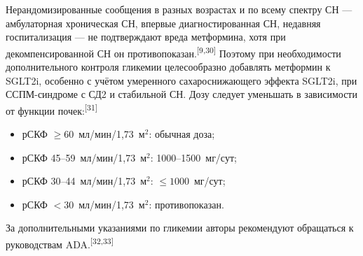 \documentclass[11pt,a4paper]{article}
\newcommand{\src}[1]{\textsuperscript{[#1]}}
\newcommand{\unitgfr}{мл/мин/1,73~м$^2$}
\begin{document}
Нерандомизированные сообщения в разных возрастах и по всему спектру СН --- амбулаторная хроническая СН, впервые диагностированная СН, недавняя госпитализация --- не подтверждают вреда метформина, хотя при декомпенсированной СН он противопоказан.\src{9,30} Поэтому при необходимости дополнительного контроля гликемии целесообразно добавлять метформин к SGLT2i, особенно с учётом умеренного сахароснижающего эффекта SGLT2i, при ССПМ-синдроме с СД2 и стабильной СН. Дозу следует уменьшать в зависимости от функции почек:\src{31}
\begin{itemize}
\item рСКФ $\geq60$~\unitgfr: обычная доза;
\item рСКФ 45--59~\unitgfr: 1000--1500~мг/сут;
\item рСКФ 30--44~\unitgfr: $\leq1000$~мг/сут;
\item рСКФ $<30$~\unitgfr: противопоказан.
\end{itemize}
За дополнительными указаниями по гликемии авторы рекомендуют обращаться к руководствам ADA.\src{32,33}
\end{document}
